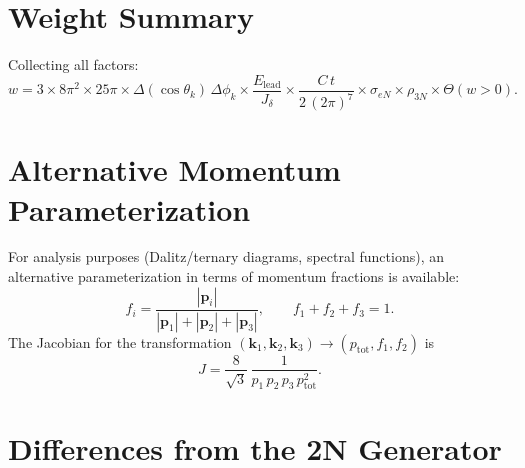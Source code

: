 \documentclass[11pt,a4paper]{article}
\newcommand{\vect}[1]{\bm{#1}}
\begin{document}
\section{Weight Summary}

Collecting all factors:
\begin{equation}
  w = 3 \times 8\pi^{2} \times 25\pi
      \times \Delta(\cos\theta_{k})\,\Delta\phi_{k}
      \times \frac{E_{\text{lead}}}{J_{\delta}}
      \times \frac{C\,t}{2\,(2\pi)^{7}}
      \times \sigma_{eN}
      \times \rho_{3N}
      \times \Theta(w > 0).
\end{equation}

\section{Alternative Momentum Parameterization}

For analysis purposes (Dalitz/ternary diagrams, spectral functions), an
alternative parameterization in terms of momentum fractions is available:
\begin{equation}
  f_{i} = \frac{|\vect{p}_{i}|}{|\vect{p}_{1}|+|\vect{p}_{2}|+|\vect{p}_{3}|},
  \qquad
  f_{1} + f_{2} + f_{3} = 1.
\end{equation}
The Jacobian for the transformation
$(\vect{k}_{1},\vect{k}_{2},\vect{k}_{3}) \to (p_{\text{tot}},f_{1},f_{2})$
is
\begin{equation}
  J = \frac{8}{\sqrt{3}}\,\frac{1}{p_{1}\,p_{2}\,p_{3}\,p_{\text{tot}}^{2}}.
\end{equation}

\section{Differences from the 2N Generator}
\end{document}
